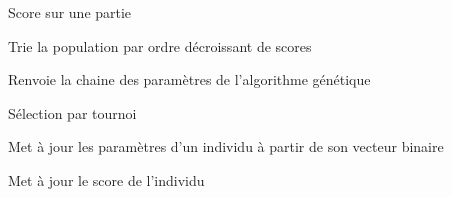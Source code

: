 \documentclass[letterpaper,10pt,french]{sphinxmanual}
\begin{document}
\begin{fulllineitems}
\begin{fulllineitems}
\label{\detokenize{index:ag_optimizer.AGOptimizer.scoreOnOneGame}}
Score sur une partie

\end{fulllineitems}


\begin{fulllineitems}
\label{\detokenize{index:ag_optimizer.AGOptimizer.sortPopulationDescending}}
Trie la population par ordre décroissant de scores

\end{fulllineitems}


\begin{fulllineitems}
\label{\detokenize{index:ag_optimizer.AGOptimizer.stringOfParameters}}
Renvoie la chaine des paramètres de l’algorithme génétique

\end{fulllineitems}


\begin{fulllineitems}
\label{\detokenize{index:ag_optimizer.AGOptimizer.tournamentSelection}}
Sélection par tournoi

\end{fulllineitems}


\begin{fulllineitems}
\label{\detokenize{index:ag_optimizer.AGOptimizer.updateBinaryIndivdu}}
Met à jour les paramètres d’un individu à partir de son vecteur binaire

\end{fulllineitems}


\begin{fulllineitems}
\label{\detokenize{index:ag_optimizer.AGOptimizer.updateScore}}
Met à jour le score de l’individu


\end{fulllineitems}
\end{fulllineitems}
\end{document}

